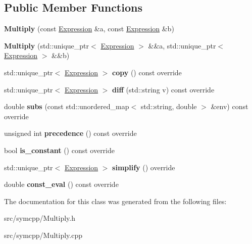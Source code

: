 \subsection*{Public Member Functions}
\begin{DoxyCompactItemize}
\item 
{\bfseries Multiply} (const \hyperlink{classExpression}{Expression} \&a, const \hyperlink{classExpression}{Expression} \&b)\hypertarget{classMultiply_a711406c2dcb2698dece37be406f6814a}{}\label{classMultiply_a711406c2dcb2698dece37be406f6814a}

\item 
{\bfseries Multiply} (std\+::unique\+\_\+ptr$<$ \hyperlink{classExpression}{Expression} $>$ \&\&a, std\+::unique\+\_\+ptr$<$ \hyperlink{classExpression}{Expression} $>$ \&\&b)\hypertarget{classMultiply_a8bfd558e273658c1ecbae243f7c662e8}{}\label{classMultiply_a8bfd558e273658c1ecbae243f7c662e8}

\item 
std\+::unique\+\_\+ptr$<$ \hyperlink{classExpression}{Expression} $>$ {\bfseries copy} () const override\hypertarget{classMultiply_ae30f69116e31410b0e1290311c3fa62f}{}\label{classMultiply_ae30f69116e31410b0e1290311c3fa62f}

\item 
std\+::unique\+\_\+ptr$<$ \hyperlink{classExpression}{Expression} $>$ {\bfseries diff} (std\+::string v) const override\hypertarget{classMultiply_a476df88140af94b85c4bdb7b790954d0}{}\label{classMultiply_a476df88140af94b85c4bdb7b790954d0}

\item 
double {\bfseries subs} (const std\+::unordered\+\_\+map$<$ std\+::string, double $>$ \&env) const override\hypertarget{classMultiply_a4e4ad6659df7cc1dcb6e065d9ff88ec6}{}\label{classMultiply_a4e4ad6659df7cc1dcb6e065d9ff88ec6}

\item 
unsigned int {\bfseries precedence} () const override\hypertarget{classMultiply_ae4301c832acd79c5c8c19fd439aa3e21}{}\label{classMultiply_ae4301c832acd79c5c8c19fd439aa3e21}

\item 
bool {\bfseries is\+\_\+constant} () const override\hypertarget{classMultiply_ad29e07c459b05dd7b228fb1cca1fb2e8}{}\label{classMultiply_ad29e07c459b05dd7b228fb1cca1fb2e8}

\item 
std\+::unique\+\_\+ptr$<$ \hyperlink{classExpression}{Expression} $>$ {\bfseries simplify} () override\hypertarget{classMultiply_ad1849d41d1070a172c6453106a2924c1}{}\label{classMultiply_ad1849d41d1070a172c6453106a2924c1}

\item 
double {\bfseries const\+\_\+eval} () const override\hypertarget{classMultiply_a6b783f4ffaf4a4e737929374d1ccc14a}{}\label{classMultiply_a6b783f4ffaf4a4e737929374d1ccc14a}

\end{DoxyCompactItemize}


The documentation for this class was generated from the following files\+:\begin{DoxyCompactItemize}
\item 
src/symcpp/Multiply.\+h\item 
src/symcpp/Multiply.\+cpp\end{DoxyCompactItemize}

